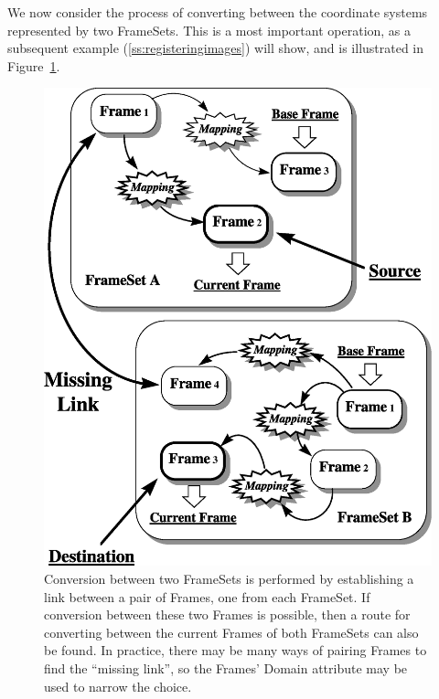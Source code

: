 \documentclass[twoside,11pt]{article}
\newenvironment{latexonly}{}{}
\newcommand{\htmlref}[2]{#1}
\newcommand{\secref}[1]{\S\ref{#1}}
\renewcommand{\secref}[1]{\ref{#1}}
\begin{document}
\begin{latexonly}
   We now consider the process of converting between the coordinate
   systems represented by two FrameSets. This is a most important
   operation, as a subsequent example (\secref{ss:registeringimages})
   will show, and is illustrated in Figure~\ref{fig:fsalign}.
   \begin{figure}
   \begin{center}
   \includegraphics[scale=0.6]{sun210_figures/fsalign.eps}
   \caption{Conversion between two FrameSets is performed by establishing
   a link between a pair of Frames, one from each \htmlref{FrameSet}{FrameSet}. If conversion
   between these two Frames is possible, then a route for converting
   between the current Frames of both FrameSets can also be found. In
   practice, there may be many ways of pairing Frames to find the
   ``missing link'', so the Frames' \htmlref{Domain}{Domain} attribute may be used to
   narrow the choice.}
   \label{fig:fsalign}
   \end{center}
   \end{figure}
\end{latexonly}
\end{document}
